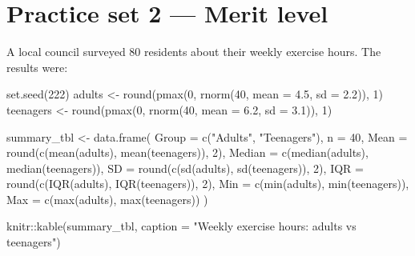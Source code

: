 \documentclass[
  11pt,
  a4paper,
  oneside,
  open=any]{scrbook}
\newenvironment{Shaded}{\begin{snugshade}}{\end{snugshade}}
\newcommand{\AttributeTok}[1]{\textcolor[rgb]{0.40,0.45,0.13}{#1}}
\newcommand{\DecValTok}[1]{\textcolor[rgb]{0.68,0.00,0.00}{#1}}
\newcommand{\FloatTok}[1]{\textcolor[rgb]{0.68,0.00,0.00}{#1}}
\newcommand{\FunctionTok}[1]{\textcolor[rgb]{0.28,0.35,0.67}{#1}}
\newcommand{\NormalTok}[1]{\textcolor[rgb]{0.00,0.23,0.31}{#1}}
\newcommand{\OtherTok}[1]{\textcolor[rgb]{0.00,0.23,0.31}{#1}}
\newcommand{\SpecialCharTok}[1]{\textcolor[rgb]{0.37,0.37,0.37}{#1}}
\newcommand{\StringTok}[1]{\textcolor[rgb]{0.13,0.47,0.30}{#1}}
\begin{document}
\section{Practice set 2 --- Merit
level}\label{practice-set-2-merit-level}

A local council surveyed 80 residents about their weekly exercise hours.
The results were:

\begin{Shaded}
\begin{Highlighting}[]
\FunctionTok{set.seed}\NormalTok{(}\DecValTok{222}\NormalTok{)}
\NormalTok{adults    }\OtherTok{\textless{}{-}} \FunctionTok{round}\NormalTok{(}\FunctionTok{pmax}\NormalTok{(}\DecValTok{0}\NormalTok{, }\FunctionTok{rnorm}\NormalTok{(}\DecValTok{40}\NormalTok{, }\AttributeTok{mean =} \FloatTok{4.5}\NormalTok{, }\AttributeTok{sd =} \FloatTok{2.2}\NormalTok{)), }\DecValTok{1}\NormalTok{)}
\NormalTok{teenagers }\OtherTok{\textless{}{-}} \FunctionTok{round}\NormalTok{(}\FunctionTok{pmax}\NormalTok{(}\DecValTok{0}\NormalTok{, }\FunctionTok{rnorm}\NormalTok{(}\DecValTok{40}\NormalTok{, }\AttributeTok{mean =} \FloatTok{6.2}\NormalTok{, }\AttributeTok{sd =} \FloatTok{3.1}\NormalTok{)), }\DecValTok{1}\NormalTok{)}

\NormalTok{summary\_tbl }\OtherTok{\textless{}{-}} \FunctionTok{data.frame}\NormalTok{(}
  \AttributeTok{Group      =} \FunctionTok{c}\NormalTok{(}\StringTok{"Adults"}\NormalTok{, }\StringTok{"Teenagers"}\NormalTok{),}
  \AttributeTok{n          =} \DecValTok{40}\NormalTok{,}
  \AttributeTok{Mean       =} \FunctionTok{round}\NormalTok{(}\FunctionTok{c}\NormalTok{(}\FunctionTok{mean}\NormalTok{(adults), }\FunctionTok{mean}\NormalTok{(teenagers)), }\DecValTok{2}\NormalTok{),}
  \AttributeTok{Median     =} \FunctionTok{c}\NormalTok{(}\FunctionTok{median}\NormalTok{(adults), }\FunctionTok{median}\NormalTok{(teenagers)),}
  \AttributeTok{SD         =} \FunctionTok{round}\NormalTok{(}\FunctionTok{c}\NormalTok{(}\FunctionTok{sd}\NormalTok{(adults), }\FunctionTok{sd}\NormalTok{(teenagers)), }\DecValTok{2}\NormalTok{),}
  \AttributeTok{IQR        =} \FunctionTok{round}\NormalTok{(}\FunctionTok{c}\NormalTok{(}\FunctionTok{IQR}\NormalTok{(adults), }\FunctionTok{IQR}\NormalTok{(teenagers)), }\DecValTok{2}\NormalTok{),}
  \AttributeTok{Min        =} \FunctionTok{c}\NormalTok{(}\FunctionTok{min}\NormalTok{(adults), }\FunctionTok{min}\NormalTok{(teenagers)),}
  \AttributeTok{Max        =} \FunctionTok{c}\NormalTok{(}\FunctionTok{max}\NormalTok{(adults), }\FunctionTok{max}\NormalTok{(teenagers))}
\NormalTok{)}

\NormalTok{knitr}\SpecialCharTok{::}\FunctionTok{kable}\NormalTok{(summary\_tbl, }\AttributeTok{caption =} \StringTok{"Weekly exercise hours: adults vs teenagers"}\NormalTok{)}
\end{Highlighting}
\end{Shaded}
\end{document}
